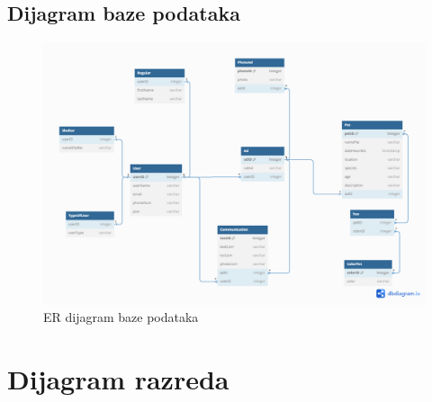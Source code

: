 			\subsection{Dijagram baze podataka}
				\begin{figure}
					\centering
					\includegraphics[width=0.8\linewidth]{ERbaza.png}
					\caption{ER dijagram baze podataka}
					\label{fig:your_label}
				\end{figure}
			
			\eject
			
			
		\section{Dijagram razreda}
		
			
			
			
